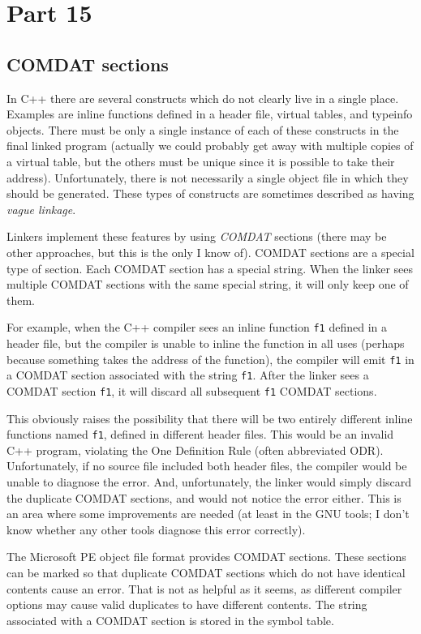 \section{Part 15}

\subsection{COMDAT sections}

In C++ there are several constructs which do not clearly live in a single
place. Examples are inline functions defined in a header file, virtual tables,
and typeinfo objects. There must be only a single instance of each of these
constructs in the final linked program (actually we could probably get away
with multiple copies of a virtual table, but the others must be unique since it
is possible to take their address). Unfortunately, there is not necessarily a
single object file in which they should be generated. These types of constructs
are sometimes described as having \emph{vague linkage}.

Linkers implement these features by using \emph{COMDAT} sections (there may
be other approaches, but this is the only I know of). COMDAT sections are a
special type of section. Each COMDAT section has a special string. When the
linker sees multiple COMDAT sections with the same special string, it will only
keep one of them.

For example, when the C++ compiler sees an inline function \texttt{f1} defined
in a header file, but the compiler is unable to inline the function in all
uses (perhaps because something takes the address of the function), the
compiler will emit \texttt{f1} in a COMDAT section associated with the string
\texttt{f1}. After the linker sees a COMDAT section \texttt{f1}, it will
discard all subsequent \texttt{f1} COMDAT sections.

This obviously raises the possibility that there will be two entirely different
inline functions named \texttt{f1}, defined in different header files. This
would be an invalid C++ program, violating the One Definition Rule (often
abbreviated ODR). Unfortunately, if no source file included both header files,
the compiler would be unable to diagnose the error. And, unfortunately, the
linker would simply discard the duplicate COMDAT sections, and would not notice
the error either. This is an area where some improvements are needed (at least
in the GNU tools; I don't know whether any other tools diagnose this error
correctly).

The Microsoft PE object file format provides COMDAT sections. These sections
can be marked so that duplicate COMDAT sections which do not have identical
contents cause an error. That is not as helpful as it seems, as different
compiler options may cause valid duplicates to have different contents. The
string associated with a COMDAT section is stored in the symbol table.

